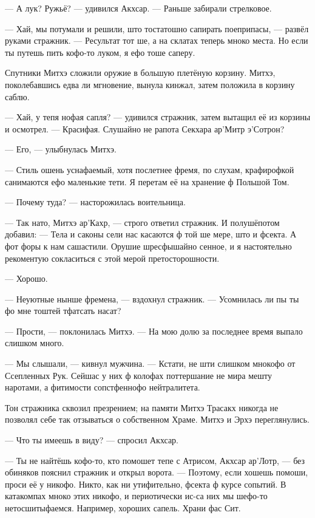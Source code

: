 --- А лук?
Ружьё? --- удивился Акхсар.
--- Раньше забирали стрелковое.

--- Хай, мы потумали и решили, што тостатошно сапирать поеприпасы, --- развёл руками стражник.
--- Ресультат тот ше, а на склатах теперь мноко места.
Но если ты путешь пить кофо-то луком, я ефо тоше саперу.

Спутники Митхэ сложили оружие в большую плетёную корзину.
Митхэ, поколебавшись едва ли мгновение, вынула кинжал, затем положила в корзину саблю.

--- Хай, у тепя нофая сапля? --- удивился стражник, затем вытащил её из корзины и осмотрел.
--- Красифая.
Слушайно не рапота Секхара ар'Митр э'Сотрон?

--- Его, --- улыбнулась Митхэ.

--- Стиль ошень уснафаемый, хотя послетнее фремя, по слухам, крафирофкой санимаются ефо маленькие тети.
Я перетам её на хранение ф Польшой Том.

--- Почему туда? --- насторожилась воительница.

--- Так нато, Митхэ ар'Кахр, --- строго ответил стражник.
И полушёпотом добавил:
--- Тела и саконы сели нас касаются ф той ше мере, што и фсекта.
А фот форы к нам сашастили.
Орушие шресфышайно сенное, и я настоятельно рекоментую сокласиться с этой мерой претосторошности.

--- Хорошо.

--- Неуютные нынше фремена, --- вздохнул стражник.
--- Усомнилась ли пы ты фо мне тоштей тфатсать насат?

--- Прости, --- поклонилась Митхэ.
--- На мою долю за последнее время выпало слишком много.

--- Мы слышали, --- кивнул мужчина.
--- Кстати, не шти слишком мнокофо от Ссепленных Рук.
Сейшас у них ф колофах поттершание не мира мешту наротами, а фитимости сопстфеннофо нейтралитета.

Тон стражника сквозил презрением;
на памяти Митхэ Трасакх никогда не позволял себе так отзываться о собственном Храме.
Митхэ и Эрхэ переглянулись.

--- Что ты имеешь в виду? --- спросил Акхсар.

--- Ты не найтёшь кофо-то, кто помошет тепе с Атрисом, Акхсар ар'Лотр, --- без обиняков пояснил стражник и открыл ворота.
--- Поэтому, если хошешь помоши, проси её у никофо.
Никто, как ни утифительно, фсекта ф курсе сопытий.
В катакомпах мноко этих никофо, и периотически ис-са них мы шефо-то нетосшитыфаемся.
Например, хороших сапель.
Храни фас Сит.

